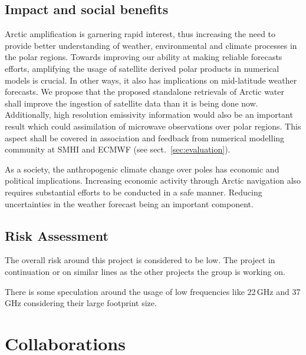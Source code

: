 \documentclass[12pt,oneside,a4paper]{article}
\begin{document}

\subsection{Impact and social benefits}
%
\label{sec:impact}
Arctic amplification is garnering rapid interest, thus increasing the need to provide better understanding of weather, environmental and climate processes in the polar regions. Towards improving our ability at making reliable forecasts efforts, amplifying the usage of satellite derived polar products in numerical models is crucial. In other ways, it also has implications on mid-latitude weather forecasts. We propose that the proposed standalone retrievals of Arctic water shall improve the ingestion of satellite data than it is being done now. Additionally, high resolution emissivity information would also be an important result which could assimilation of microwave observations over polar regions. This aspect shall be covered in association and feedback from numerical modelling community at SMHI and ECMWF (see sect.~\ref{sec:evaluation}).

As a society, the anthropogenic climate change over poles has economic and political implications. Increasing economic activity through Arctic navigation also requires substantial efforts to be conducted in a safe manner. Reducing uncertainties in the weather forecast being an important component. 

 
\subsection{Risk Assessment}
%
\label{sec:risk}
The overall risk around this project is considered to be low. The project in continuation or on similar lines as the other projects the group is working on.

 There is some speculation around the usage of low frequencies like 22\,GHz and 37\,GHz considering their large footprint size.  

\section{Collaborations}
\end{document}

